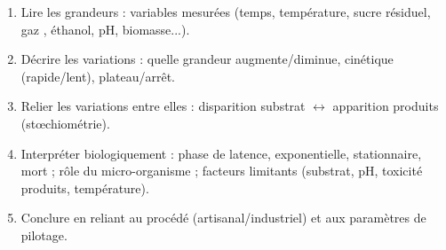 \documentclass[11pt]{article}
\newcommand{\cle}[1]{{\popxbold\color{popdark}#1}}
\begin{document}
\begin{methode}
\begin{enumerate}
\item \cle{Lire les grandeurs} : variables mesurées (temps, température, sucre résiduel, gaz , éthanol, pH, biomasse...).
\item \cle{Décrire les variations} : quelle grandeur augmente/diminue, cinétique (rapide/lent), plateau/arrêt.
\item \cle{Relier les variations entre elles} : disparition substrat $\leftrightarrow$ apparition produits (stœchiométrie).
\item \cle{Interpréter biologiquement} : phase de latence, exponentielle, stationnaire, mort ; rôle du micro-organisme ; facteurs limitants (substrat, pH, toxicité produits, température).
\item \cle{Conclure} en reliant au procédé (artisanal/industriel) et aux paramètres de pilotage.
\end{enumerate}
\end{methode}
\end{document}

